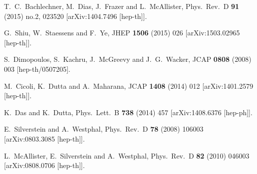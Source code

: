 \begin{thebibliography}{10}
  T.~C.~Bachlechner, M.~Dias, J.~Frazer and L.~McAllister,
  Phys.\ Rev.\ D {\bf 91} (2015) no.2,  023520
  [arXiv:1404.7496 [hep-th]].


  G.~Shiu, W.~Staessens and F.~Ye,
  JHEP {\bf 1506} (2015) 026
  [arXiv:1503.02965 [hep-th]].


  S.~Dimopoulos, S.~Kachru, J.~McGreevy and J.~G.~Wacker,
  JCAP {\bf 0808} (2008) 003
  [hep-th/0507205].


  M.~Cicoli, K.~Dutta and A.~Maharana,
  JCAP {\bf 1408} (2014) 012
  [arXiv:1401.2579 [hep-th]].


  K.~Das and K.~Dutta,
  Phys.\ Lett.\ B {\bf 738} (2014) 457
  [arXiv:1408.6376 [hep-ph]].


  E.~Silverstein and A.~Westphal,
  Phys.\ Rev.\ D {\bf 78} (2008) 106003
  [arXiv:0803.3085 [hep-th]].


  L.~McAllister, E.~Silverstein and A.~Westphal,
  Phys.\ Rev.\ D {\bf 82} (2010) 046003
  [arXiv:0808.0706 [hep-th]].



\end{thebibliography}
